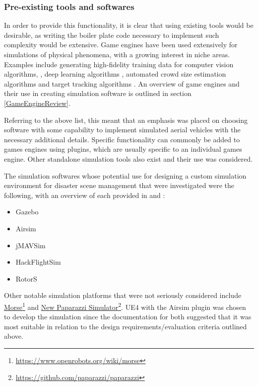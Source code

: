 \subsubsection{Pre-existing tools and softwares}
In order to provide this functionality, it is clear that using existing tools would be desirable, as writing the boiler plate code necessary to implement such complexity would be extensive. Game engines have been used extensively for simulations of physical phenomena, with a growing interest in niche areas. Examples include generating high-fidelity training data for computer vision algorithms, \cite{QiuUnrealCV:Engine}, deep learning algorithms \cite{GaidonVirtualAnalysis}, automated crowd size estimation algorithms \cite{Lee2018DigitalCrowds} and target tracking algorithms \cite{Mueller2016ATracking}. An overview of game engines and their use in creating simulation software is outlined in section \ref{GameEngineReview}.

Referring to the above list, this meant that an emphasis was placed on choosing software with some capability to implement simulated aerial vehicles with the necessary additional details. Specific functionality can commonly be added to games engines using plugins, which are usually specific to an individual games engine. Other standalone simulation tools also exist and their use was considered.\par

The simulation softwares whose potential use for designing a custom simulation environment for disaster scene management that were investigated were the following, with an overview of each provided in \cite{Ebeid2018ASimulators} and \cite{ShahAirSim:Vehicles}: 
\begin{itemize}
    \item Gazebo
    \item Airsim
    \item jMAVSim
    \item HackFlightSim
    \item RotorS
\end{itemize}
Other notable simulation platforms that were not seriously considered include \href{https://www.openrobots.org/wiki/morse}{Morse}\footnote{\href {https://www.openrobots.org/wiki/morse}{https://www.openrobots.org/wiki/morse}} and \href{https://github.com/paparazzi/paparazzi}{New Paparazzi Simulator}\footnote{\href {https://github.com/paparazzi/paparazzi}{https://github.com/paparazzi/paparazzi}}.
UE4 with the Airsim plugin was chosen to develop the simulation since the documentation for both suggested that it was most suitable in relation to the design requirements/evaluation criteria outlined above.\par

